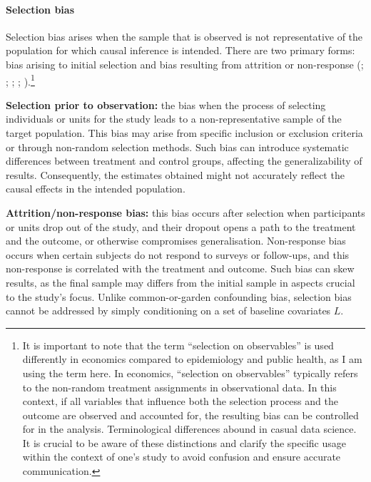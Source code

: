 \documentclass[
  singlecolumn,
  9pt]{article}
\let\oldparagraph\paragraph
\renewcommand{\paragraph}[1]{\oldparagraph{#1}\mbox{}}
\begin{document}
\paragraph{Selection bias}\label{selection-bias}

Selection bias arises when the sample that is observed is not
representative of the population for which causal inference is intended.
There are two primary forms: bias arising to initial selection and bias
resulting from attrition or non-response
(;
;
; ; ).\footnote{It is important to note that the term ``selection on
  observables'' is used differently in economics compared to
  epidemiology and public health, as I am using the term here. In
  economics, ``selection on observables'' typically refers to the
  non-random treatment assignments in observational data. In this
  context, if all variables that influence both the selection process
  and the outcome are observed and accounted for, the resulting bias can
  be controlled for in the analysis. Terminological differences abound
  in casual data science. It is crucial to be aware of these
  distinctions and clarify the specific usage within the context of
  one's study to avoid confusion and ensure accurate communication.}

\textbf{Selection prior to observation:} the bias when the process of
selecting individuals or units for the study leads to a
non-representative sample of the target population. This bias may arise
from specific inclusion or exclusion criteria or through non-random
selection methods. Such bias can introduce systematic differences
between treatment and control groups, affecting the generalizability of
results. Consequently, the estimates obtained might not accurately
reflect the causal effects in the intended population.

\textbf{Attrition/non-response bias:} this bias occurs after selection
when participants or units drop out of the study, and their dropout
opens a path to the treatment and the outcome, or otherwise compromises
generalisation. Non-response bias occurs when certain subjects do not
respond to surveys or follow-ups, and this non-response is correlated
with the treatment and outcome. Such bias can skew results, as the final
sample may differs from the initial sample in aspects crucial to the
study's focus. Unlike common-or-garden confounding bias, selection bias
cannot be addressed by simply conditioning on a set of baseline
covariates \(L\).
\end{document}
